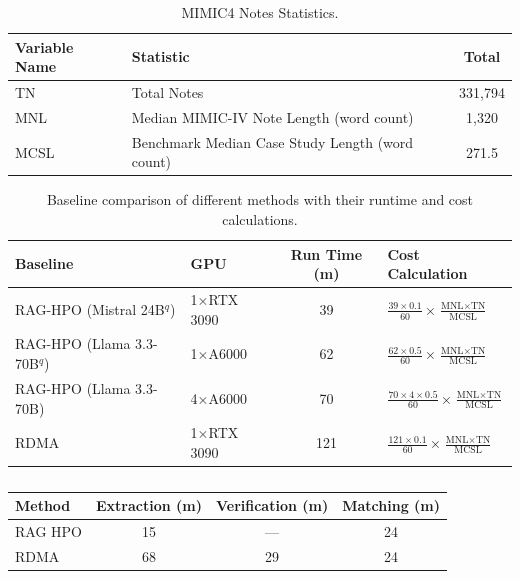 \begin{table}[h]
\centering
\begin{tabular}{|l|l|c|}
\hline
\textbf{Variable Name} & \textbf{Statistic} & \textbf{Total} \\
\hline
TN & Total Notes & 331,794 \\
\hline
MNL & Median MIMIC-IV Note Length (word count) & 1,320 \\
\hline
MCSL & Benchmark Median Case Study Length (word count) & 271.5 \\
\hline
\end{tabular}
\caption{MIMIC4 Notes Statistics.}
\label{tab:mimic4_stats}
\end{table}

\begin{table}[h]
\centering
\renewcommand{\arraystretch}{2.4}
\begin{tabular}{|l|l|c|>{\centering\arraybackslash}p{4cm}|}
\hline
\textbf{Baseline} & \textbf{GPU} & \textbf{Run Time (m)} & \textbf{Cost Calculation} \\
\hline
RAG-HPO (Mistral 24B$^q$) & 1$\times$RTX 3090 & 39 & $\displaystyle\frac{39 \times 0.1}{60} \times \frac{\text{MNL} \times \text{TN}}{\text{MCSL}}$ \\
\hline
RAG-HPO (Llama 3.3-70B$^q$) & 1$\times$A6000 & 62 & $\displaystyle\frac{62 \times 0.5}{60} \times \frac{\text{MNL} \times \text{TN}}{\text{MCSL}}$ \\
\hline
RAG-HPO (Llama 3.3-70B) & 4$\times$A6000 & 70 & $\displaystyle\frac{70 \times 4 \times 0.5}{60} \times \frac{\text{MNL} \times \text{TN}}{\text{MCSL}}$ \\
\hline
RDMA & 1$\times$RTX 3090 & 121 & $\displaystyle\frac{121 \times 0.1}{60} \times \frac{\text{MNL} \times \text{TN}}{\text{MCSL}}$ \\
\hline
\end{tabular}
\caption{Baseline comparison of different methods with their runtime and cost calculations.}
\label{tab:cost_calculations}
\end{table}

\begin{table}[h]
\centering
\caption{}
\label{tab:runtime_mistral24b_rdma_raghpo}
\begin{tabular}{lccc}
\toprule
\textbf{Method} & \textbf{Extraction (m)} & \textbf{Verification (m)} & \textbf{Matching (m)} \\
\midrule
RAG HPO & 15 & --- & 24 \\
RDMA    & 68 & 29  & 24 \\
\bottomrule
\end{tabular}
\end{table}


